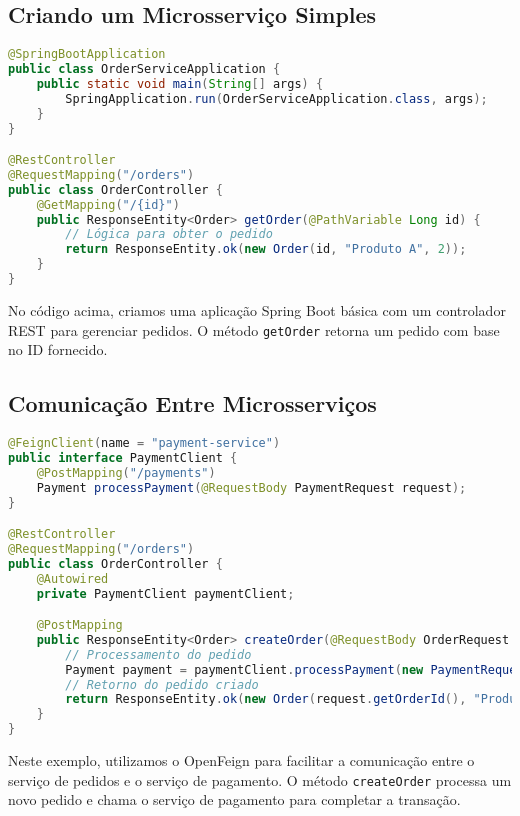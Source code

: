 \documentclass[a4paper,12pt]{book}
\begin{document}
\subsection{Criando um Microsserviço Simples}
\begin{lstlisting}[language=Java, caption=Criando um microsserviço simples com Spring Boot]
@SpringBootApplication
public class OrderServiceApplication {
    public static void main(String[] args) {
        SpringApplication.run(OrderServiceApplication.class, args);
    }
}

@RestController
@RequestMapping("/orders")
public class OrderController {
    @GetMapping("/{id}")
    public ResponseEntity<Order> getOrder(@PathVariable Long id) {
        // Lógica para obter o pedido
        return ResponseEntity.ok(new Order(id, "Produto A", 2));
    }
}
\end{lstlisting}

No código acima, criamos uma aplicação Spring Boot básica com um controlador REST para gerenciar pedidos. O método \texttt{getOrder} retorna um pedido com base no ID fornecido.

\subsection{Comunicação Entre Microsserviços}
\begin{lstlisting}[language=Java, caption=Comunicação entre microsserviços com OpenFeign]
@FeignClient(name = "payment-service")
public interface PaymentClient {
    @PostMapping("/payments")
    Payment processPayment(@RequestBody PaymentRequest request);
}

@RestController
@RequestMapping("/orders")
public class OrderController {
    @Autowired
    private PaymentClient paymentClient;

    @PostMapping
    public ResponseEntity<Order> createOrder(@RequestBody OrderRequest request) {
        // Processamento do pedido
        Payment payment = paymentClient.processPayment(new PaymentRequest(request.getOrderId(), request.getAmount()));
        // Retorno do pedido criado
        return ResponseEntity.ok(new Order(request.getOrderId(), "Produto A", 2, payment.getStatus()));
    }
}
\end{lstlisting}

Neste exemplo, utilizamos o OpenFeign para facilitar a comunicação entre o serviço de pedidos e o serviço de pagamento. O método \texttt{createOrder} processa um novo pedido e chama o serviço de pagamento para completar a transação.
\end{document}
